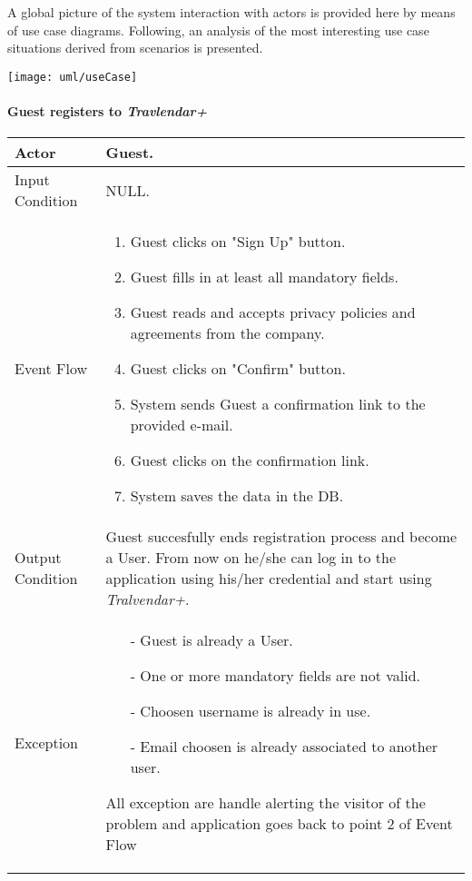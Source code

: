 A global picture of the system interaction with actors is provided here by means of use case diagrams. Following, an analysis of the most interesting use case situations derived from scenarios is presented.

	\texttt{[image: uml/useCase]}

	\paragraph{Guest registers to \textit{Travlendar+}} \label{register_useCase}
	
		\begin{tabular}{| l | p{} | }
			\hline
			\hline
			Actor	&		Guest. \\
			\hline
			Input Condition		&		NULL. \\
			\hline
			Event Flow		&		\begin{enumerate}
												\item Guest clicks on "Sign Up" button.
												\item Guest fills in at least all mandatory fields.
												\item Guest reads and accepts privacy policies and agreements from the company.
												\item Guest clicks on "Confirm" button.
												\item System sends Guest a confirmation link to the provided e-mail.
												\item Guest clicks on the confirmation link.
												\item	 System saves the data in the DB.
											\end{enumerate} \\
			\hline
			Output Condition		&		Guest succesfully ends registration process and become a User. From now on he/she can log in to the application using his/her credential and start using \textit{Tralvendar+}. \\
			\hline		
			Exception		&		\begin{itemize}
											\item[-] Guest is already a User.
											\item[-] One or more mandatory fields are not valid.
											\item[-] Choosen username is already in use.
											\item[-] Email choosen is already associated to another user.
										\end{itemize}
										All exception are handle alerting the visitor of the problem and application goes back to point 2 of Event Flow \\
			\hline
			\hline
		\end{tabular}

